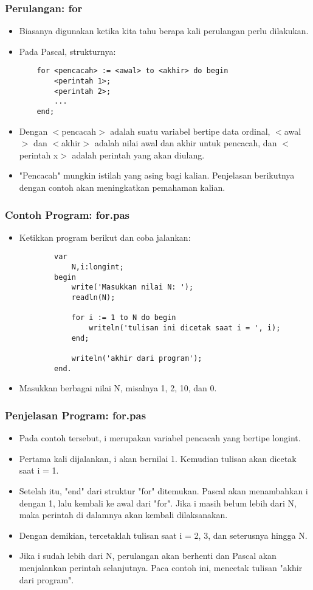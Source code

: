 \documentclass{beamer}
\begin{document}
\begin{frame}[fragile]
\frametitle{Perulangan: for}
\begin{itemize}
	\item Biasanya digunakan ketika kita tahu berapa kali perulangan perlu dilakukan.
	\item Pada Pascal, strukturnya:
	\begin{lstlisting}
	for <pencacah> := <awal> to <akhir> do begin
	    <perintah 1>;
	    <perintah 2>;
	    ...
	end;
	\end{lstlisting}
	\item Dengan $<$pencacah$>$ adalah suatu variabel bertipe data \alert{ordinal}, $<$awal$>$ dan $<$akhir$>$ adalah nilai awal dan akhir untuk pencacah, dan $<$perintah x$>$ adalah perintah yang akan diulang.
	\item "Pencacah" mungkin istilah yang asing bagi kalian. Penjelasan berikutnya dengan contoh akan meningkatkan pemahaman kalian.
\end{itemize}
\end{frame}

\begin{frame}[fragile]
\frametitle{Contoh Program: for.pas}
\begin{itemize}
	\item Ketikkan program berikut dan coba jalankan:
	\begin{lstlisting}
		var
		    N,i:longint;
		begin
		    write('Masukkan nilai N: ');
		    readln(N);
		
		    for i := 1 to N do begin
		        writeln('tulisan ini dicetak saat i = ', i);
		    end;
		    
		    writeln('akhir dari program');
		end.
	\end{lstlisting}
	\item Masukkan berbagai nilai N, misalnya 1, 2, 10, dan 0.
\end{itemize}
\end{frame}

\begin{frame}
\frametitle{Penjelasan Program: for.pas}
\begin{itemize}
	\item Pada contoh tersebut, i merupakan variabel pencacah yang bertipe longint.
	\item Pertama kali dijalankan, i akan bernilai 1. Kemudian tulisan akan dicetak saat i = 1.
	\item Setelah itu, "end" dari struktur "for" ditemukan. Pascal akan menambahkan i dengan 1, lalu kembali ke awal dari "for". Jika i masih belum lebih dari N, maka perintah di dalamnya akan kembali dilaksanakan.
	\item Dengan demikian, tercetaklah tulisan saat i = 2, 3, dan seterusnya hingga N.
	\item Jika i sudah lebih dari N, perulangan akan berhenti dan Pascal akan menjalankan perintah selanjutnya. Paca contoh ini, mencetak tulisan "akhir dari program".
\end{itemize}
\end{frame}
\end{document}
